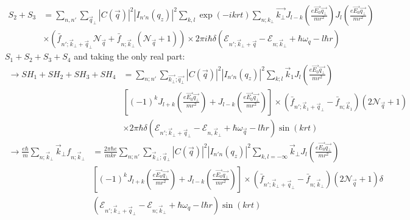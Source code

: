 \documentclass{article}
\begin{document}
\begin{align*}
S_2 + S_3 &= \sum_{n,n'} \sum_{\vec{q}_{\bot}} |C(\vec{q})|^2 |I_{n'n}(q_z)|^2 \sum_{k,l} \exp(-i k r t) \sum_{n;k_\bot} \vec{k_\bot} J_{l-k} \left( \frac{e \vec{E_0} \vec{q_{\bot}}}{m r^2} \right) J_{l} \left( \frac{e \vec{E_0} \vec{q_{\bot}}}{m r^2} \right)\\
&\times \left( \bar{f}_{n'; \vec{k}_{\bot}+\vec{q}_{\bot}} \mathcal{N}_{\vec{q}} + \bar{f}_{n; \vec{k}_{\bot}} (\mathcal{N}_{\vec{q}} + 1) \right) \times 2\pi i \hbar \delta \left( \mathcal{E}_{n'; \vec{k}_{\bot}+\vec{q}} - \mathcal{E}_{n; \vec{k}_{\bot}} + \hbar \omega_q - l \hbar r \right)
\end{align*}
$S_1 + S_2 + S_3 + S_4$ and taking the only real part:
\begin{align*}
    \rightarrow SH_1+SH_2+SH_3+SH_4 &= \sum_{n;n'} \sum_{\vec{k_\bot};\vec{q_\bot}} |C(\vec{q})|^2 |I_{n'n}(q_z)|^2 \sum_{k;l} \vec{k}_1 J_{l} \left( \frac{e \vec{E_0} \vec{q_{\bot}}}{m r^2} \right) \\
    &\left[ (-1)^{k} J_{l+k} \left( \frac{e \vec{E_0} \vec{q_\bot}}{m r^2} \right) + J_{l-k} \left( \frac{e \vec{E_0} \vec{q_{\bot}}}{m r^2} \right) \right] 
    \times (\bar{f}_{n'; \vec{k}_1+\vec{q}_{\bot}} - \bar{f}_{n; \vec{k}_1})(2\mathcal{N}_{\vec{q}}+1)\\& \times 2\pi \hbar \delta (\mathcal{E}_{n'; \vec{k}_\bot+\vec{q}_{\bot}} - \mathcal{E}_{n, \vec{k}_\bot} + \hbar \omega_{\vec{q}} - l \hbar r) \sin(k r t)
\end{align*}
\begin{align*}
    \rightarrow \frac{e\hbar}{m} \sum_{n; \vec{k}_\bot} \vec{k}_\bot f_{n; \vec{k}_\bot} &= \frac{2\pi \hbar e}{m kr} \sum_{n;n'} \sum_{\vec{k}_\bot; \vec{q}_{\bot}} |C(\vec{q})|^2 |I_{n'n}(q_z)|^2 \sum_{k,l=-\infty} \vec{k}_\bot J_{l} \left( \frac{e \vec{E_0} \vec{q_{\bot}}}{m r^2} 
    \right)\\ & \left[ (-1)^{k} J_{l+k} \left( \frac{e \vec{E_0} \vec{q_\bot}}{m r^2} \right) + J_{l-k} \left( \frac{e \vec{E_0} \vec{q_{\bot}}}{m r^2} \right) \right]\times (\bar{f}_{n'; \vec{k}_\bot+\vec{q}_{\bot}} - \bar{f}_{n; \vec{k}_\bot}) (2\mathcal{N}_{\vec{q}} + 1) \delta\\
    & (\mathcal{E}_{n'; \vec{k}_\bot+\vec{q}_{\bot}} - \mathcal{E}_{n; \vec{k}_\bot} + \hbar \omega_q - l \hbar r) \sin(k r t)
\end{align*}
\end{document}
